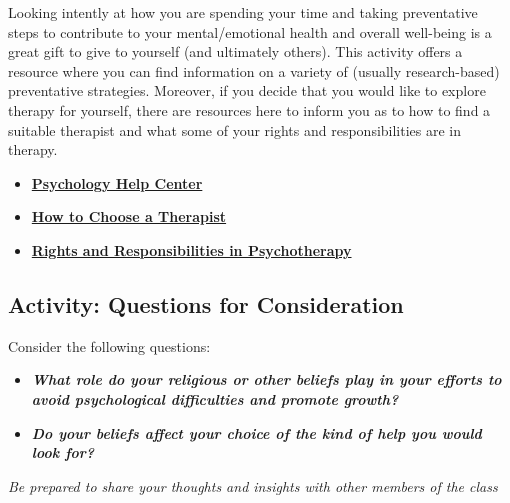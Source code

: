 \documentclass[
]{book}
\providecommand{\tightlist}{%
  \setlength{\itemsep}{0pt}\setlength{\parskip}{0pt}}
\begin{document}
\begin{reflect}
Looking intently at how you are spending your time and taking preventative steps to contribute to your mental/emotional health and overall well-being is a great gift to give to yourself (and ultimately others). This activity offers a resource where you can find information on a variety of (usually research-based) preventative strategies. Moreover, if you decide that you would like to explore therapy for yourself, there are resources here to inform you as to how to find a suitable therapist and what some of your rights and responsibilities are in therapy.

\begin{itemize}
\tightlist
\item
  \href{https://www.apa.org/helpcenter/}{\textbf{Psychology Help Center}}\\
\item
  \href{http://psychcentral.com/therapst.htm}{\textbf{How to Choose a Therapist}}\\
\item
  \href{https://psychcentral.com/blog/your-patient-rights-in-therapy\#1}{\textbf{Rights and Responsibilities in Psychotherapy}}
\end{itemize}
\end{reflect}

\hypertarget{activity-questions-for-consideration-21}{%
\subsection*{Activity: Questions for Consideration}\label{activity-questions-for-consideration-21}}

\begin{reflect}
Consider the following questions:

\begin{itemize}
\tightlist
\item
  \textbf{\emph{What role do your religious or other beliefs play in your efforts to avoid psychological difficulties and promote growth?}}
\item
  \textbf{\emph{Do your beliefs affect your choice of the kind of help you would look for?}}
\end{itemize}

\emph{Be prepared to share your thoughts and insights with other members of the class}
\end{reflect}
\end{document}
